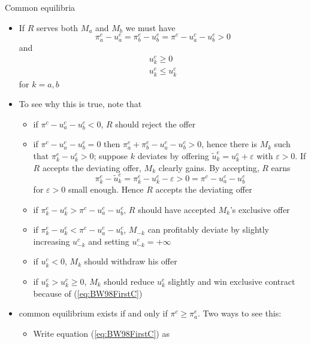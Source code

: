 \documentclass[11pt,english]{beamer}
\newcommand{\ve}{\varepsilon}
\begin{document}
\begin{frame}[allowframebreaks]{Common equilibria}
  \begin{itemize}
  \item If $R$ serves both $M_a$ and $M_b$ we must have
    \begin{equation}
      \label{eq:BW98FirstC}
      \pi^e_a-u_a^e=\pi^e_b-u_b^e=\pi^c-u_a^c-u_b^c >0
    \end{equation}
    and
    \begin{eqnarray}
      \label{eq:BW98SecondC}
      u_k^c \geq 0 \\
      \label{eq:BW98ThirdC}
      u_k^e \leq u_k^c
    \end{eqnarray}
    for $k=a,b$
  \item To see why this is true, note that
    \begin{itemize}
    \item if $\pi^c-u_a^c-u_b^c <0$, $R$ should reject the offer
    \item if $\pi^c-u_a^c-u_b^c =0$ then $\pi_a^e+\pi_b^e -
      u_a^c-u_b^c >0$, hence there is $M_k$ such that
      $\pi_k^e-u_k^c>0$; suppose $k$ deviates by offering
      $\tilde{u}_k^e = u_k^c+\ve$ with $\ve>0$. If $R$ accepts the
      deviating offer, $M_k$ clearly gains. By accepting, $R$ earns
      \begin{equation*}
        \pi_k^e-\tilde{u}_k^e = \pi_k^e-u_k^c-\ve > 0 = \pi^c-u_a^c-u_b^c
      \end{equation*}
      for $\ve>0$ small enough. Hence $R$ accepts the deviating offer
    \item if $\pi^e_k-u_k^e> \pi^c-u_a^c-u_b^c$, $R$ should have
      accepted $M_k$'s exclusive offer
    \item if $\pi^e_k-u_k^e< \pi^c-u_a^c-u_b^c$, $M_{-k}$ can
      profitably deviate by slightly increasing $u_{-k}^c$ and setting
      $u_{-k}^e =+\infty$
    \item if $u_k^c <0$, $M_k$ should withdraw his offer
    \item if $u_k^e > u_k^c \geq 0$, $M_k$ should reduce $u_k^e$
      slightly and win exclusive contract because of (\ref{eq:BW98FirstC})
    \end{itemize}
  \item common equilibrium exists if and only if $\pi^c \geq
    \pi_a^e$. Two ways to see this:
    \begin{itemize}
    \item Write equation (\ref{eq:BW98FirstC}) as
      \begin{equation*}

\end{equation*}
\end{itemize}
\end{itemize}
\end{frame}
\end{document}
